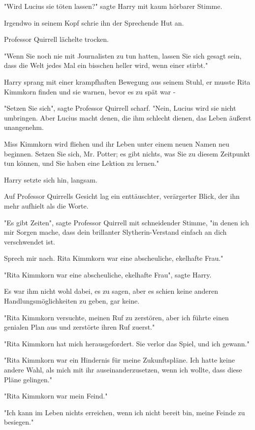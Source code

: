 {"Wird Lucius sie töten lassen?" sagte Harry mit kaum hörbarer Stimme.

Irgendwo in seinem Kopf schrie ihn der Sprechende Hut an.

Professor Quirrell lächelte trocken.

"Wenn Sie noch nie mit Journalisten zu tun hatten, lassen Sie sich gesagt sein, dass die Welt jedes Mal ein bisschen heller wird, wenn einer stirbt."

Harry sprang mit einer krampfhaften Bewegung aus seinem Stuhl, er musste Rita Kimmkorn finden und sie warnen, bevor es zu spät war -

"Setzen Sie sich", sagte Professor Quirrell scharf. "Nein, Lucius wird sie nicht umbringen. Aber Lucius macht denen, die ihm schlecht dienen, das Leben äußerst unangenehm.

Miss Kimmkorn wird fliehen und ihr Leben unter einem neuen Namen neu beginnen. Setzen Sie sich, Mr. Potter; es gibt nichts, was Sie zu diesem Zeitpunkt tun können, und Sie haben eine Lektion zu lernen."

Harry setzte sich hin, langsam.

Auf Professor Quirrells Gesicht lag ein enttäuschter, verärgerter Blick, der ihn mehr aufhielt als die Worte.

"Es gibt Zeiten", sagte Professor Quirrell mit schneidender Stimme, "in denen ich mir Sorgen mache, dass dein brillanter Slytherin-Verstand einfach an dich verschwendet ist.

Sprech mir nach. Rita Kimmkorn war eine abscheuliche, ekelhafte Frau."

"Rita Kimmkorn war eine abscheuliche, ekelhafte Frau", sagte Harry.

Es war ihm nicht wohl dabei, es zu sagen, aber es schien keine anderen Handlungsmöglichkeiten zu geben, gar keine.

"Rita Kimmkorn versuchte, meinen Ruf zu zerstören, aber ich führte einen genialen Plan aus und zerstörte ihren Ruf zuerst."

"Rita Kimmkorn hat mich herausgefordert. Sie verlor das Spiel, und ich gewann."

"Rita Kimmkorn war ein Hindernis für meine Zukunftspläne. Ich hatte keine andere Wahl, als mich mit ihr auseinanderzusetzen, wenn ich wollte, dass diese Pläne gelingen."

"Rita Kimmkorn war mein Feind."

"Ich kann im Leben nichts erreichen, wenn ich nicht bereit bin, meine Feinde zu besiegen."

}
